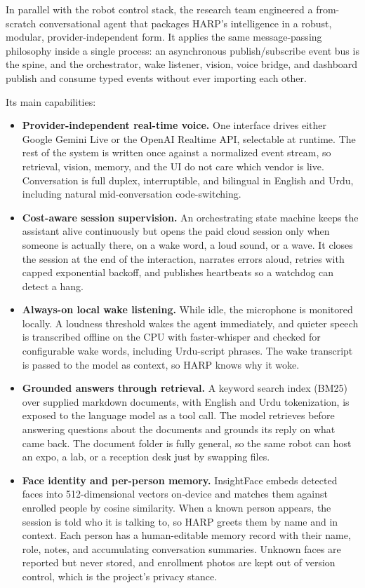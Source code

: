 \documentclass[11pt,a4paper]{article}
\begin{document}
In parallel with the robot control stack, the research team engineered a from-scratch conversational agent that packages HARP's intelligence in a robust, modular, provider-independent form. It applies the same message-passing philosophy inside a single process: an asynchronous publish/subscribe event bus is the spine, and the orchestrator, wake listener, vision, voice bridge, and dashboard publish and consume typed events without ever importing each other.

Its main capabilities:

\begin{itemize}
\item \textbf{Provider-independent real-time voice.} One interface drives either Google Gemini Live or the OpenAI Realtime API, selectable at runtime. The rest of the system is written once against a normalized event stream, so retrieval, vision, memory, and the UI do not care which vendor is live. Conversation is full duplex, interruptible, and bilingual in English and Urdu, including natural mid-conversation code-switching.
\item \textbf{Cost-aware session supervision.} An orchestrating state machine keeps the assistant alive continuously but opens the paid cloud session only when someone is actually there, on a wake word, a loud sound, or a wave. It closes the session at the end of the interaction, narrates errors aloud, retries with capped exponential backoff, and publishes heartbeats so a watchdog can detect a hang.
\item \textbf{Always-on local wake listening.} While idle, the microphone is monitored locally. A loudness threshold wakes the agent immediately, and quieter speech is transcribed offline on the CPU with faster-whisper and checked for configurable wake words, including Urdu-script phrases. The wake transcript is passed to the model as context, so HARP knows why it woke.
\item \textbf{Grounded answers through retrieval.} A keyword search index (BM25) over supplied markdown documents, with English and Urdu tokenization, is exposed to the language model as a tool call. The model retrieves before answering questions about the documents and grounds its reply on what came back. The document folder is fully general, so the same robot can host an expo, a lab, or a reception desk just by swapping files.
\item \textbf{Face identity and per-person memory.} InsightFace embeds detected faces into 512-dimensional vectors on-device and matches them against enrolled people by cosine similarity. When a known person appears, the session is told who it is talking to, so HARP greets them by name and in context. Each person has a human-editable memory record with their name, role, notes, and accumulating conversation summaries. Unknown faces are reported but never stored, and enrollment photos are kept out of version control, which is the project's privacy stance.

\end{itemize}
\end{document}

